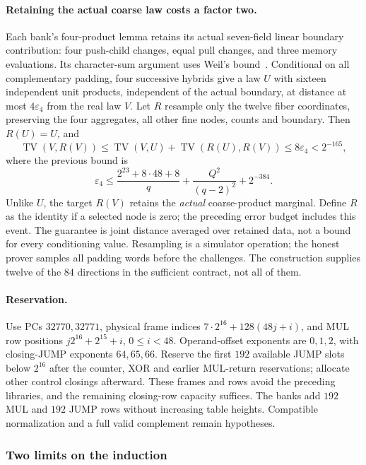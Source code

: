 \paragraph{Retaining the actual coarse law costs a factor two.} Each bank's four-product lemma retains its actual seven-field linear boundary contribution: four push-child changes, equal pull changes, and three memory evaluations. Its character-sum argument uses Weil's bound~\cite{winger}. Conditional on all complementary padding, four successive hybrids give a law $U$ with sixteen independent unit products, independent of the actual boundary, at distance at most $4\varepsilon_4$ from the real law $V$. Let $R$ resample only the twelve fiber coordinates, preserving the four aggregates, all other fine nodes, counts and boundary. Then $R(U)=U$, and
\[
 \operatorname{TV}(V,R(V))
 \le\operatorname{TV}(V,U)+\operatorname{TV}(R(U),R(V))
 \le8\varepsilon_4<2^{-165},
\]
where the previous bound is
\[
 \varepsilon_4\le\frac{2^{23}+8\cdot48+8}{q}
       +\frac{Q^2}{(q-2)^2}+2^{-384}.
\]
Unlike $U$, the target $R(V)$ retains the \emph{actual} coarse-product marginal. Define $R$ as the identity if a selected node is zero; the preceding error budget includes this event. The guarantee is joint distance averaged over retained data, not a bound for every conditioning value. Resampling is a simulator operation; the honest prover samples all padding words before the challenges. The construction supplies twelve of the $84$ directions in the sufficient contract, not all of them.

\paragraph{Reservation.} Use PCs $32770,32771$, physical frame indices $7\cdot2^{16}+128(48j+i)$, and MUL row positions $j2^{16}+2^{15}+i$, $0\le i<48$. Operand-offset exponents are $0,1,2$, with closing-JUMP exponents $64,65,66$. Reserve the first $192$ available JUMP slots below $2^{16}$ after the counter, XOR and earlier MUL-return reservations; allocate other control closings afterward. These frames and rows avoid the preceding libraries, and the remaining closing-row capacity suffices. The banks add $192$ MUL and $192$ JUMP rows without increasing table heights. Compatible normalization and a full valid complement remain hypotheses.

\subsubsection{Two limits on the induction}

